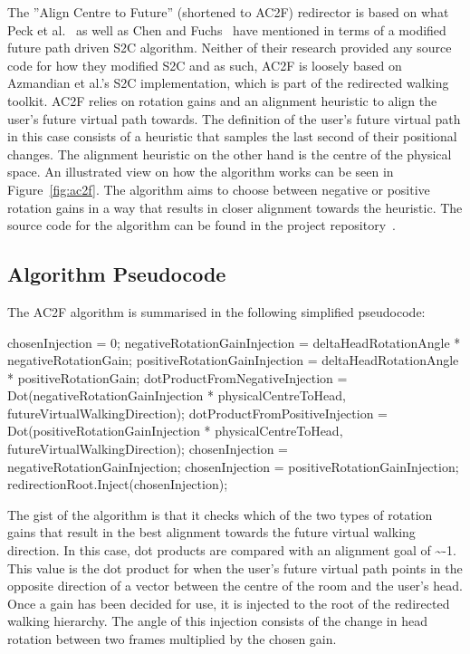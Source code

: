 The ''Align Centre to Future'' (shortened to AC2F) redirector is based on what Peck et al.~\cite{peck2010improved} as well as Chen and Fuchs~\cite{chen2017towards, chen2017supporting} have mentioned in terms of a modified future path driven S2C algorithm. Neither of their research provided any source code for how they modified S2C and as such, AC2F is loosely based on Azmandian et al.'s S2C implementation, which is part of the redirected walking toolkit. AC2F relies on rotation gains and an alignment heuristic to align the user's future virtual path towards. The definition of the user's future virtual path in this case consists of a heuristic that samples the last second of their positional changes. The alignment heuristic on the other hand is the centre of the physical space. An illustrated view on how the algorithm works can be seen in Figure~\ref{fig:ac2f}. The algorithm aims to choose between negative or positive rotation gains in a way that results in closer alignment towards the heuristic. The source code for the algorithm can be found in the project repository~\cite{ac2fScript}.

\subsection{Algorithm Pseudocode}
The AC2F algorithm is summarised in the following simplified pseudocode:
\\
\begin{algorithmic}
\State chosenInjection = 0; 
    \State negativeRotationGainInjection = deltaHeadRotationAngle * negativeRotationGain;
    \State positiveRotationGainInjection = deltaHeadRotationAngle * positiveRotationGain;
    \State dotProductFromNegativeInjection = Dot(negativeRotationGainInjection * physicalCentreToHead, futureVirtualWalkingDirection);
    \State dotProductFromPositiveInjection = Dot(positiveRotationGainInjection * physicalCentreToHead, futureVirtualWalkingDirection);
        \State chosenInjection = negativeRotationGainInjection;
    \Else
        \State chosenInjection = positiveRotationGainInjection;
    \EndIf
\EndIf
\State redirectionRoot.Inject(chosenInjection);
\end{algorithmic}

\vspace{0.3cm}
The gist of the algorithm is that it checks which of the two types of rotation gains that result in the best alignment towards the future virtual walking direction. In this case, dot products are compared with an alignment goal of \textasciitilde-1. This value is the dot product for when the user's future virtual path points in the opposite direction of a vector between the centre of the room and the user's head. Once a gain has been decided for use, it is injected to the root of the redirected walking hierarchy. The angle of this injection consists of the change in head rotation between two frames multiplied by the chosen gain.


